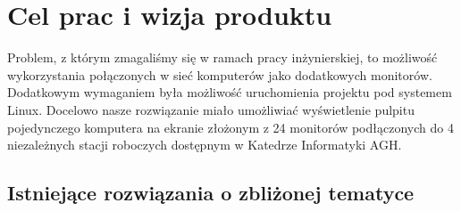 \section{Cel prac i wizja produktu}

  Problem, z którym zmagaliśmy się w ramach pracy inżynierskiej, to możliwość wykorzystania połączonych w sieć komputerów jako dodatkowych monitorów. Dodatkowym wymaganiem była możliwość uruchomienia projektu pod systemem Linux. Docelowo nasze rozwiązanie miało umożliwiać wyświetlenie pulpitu pojedynczego komputera na ekranie złożonym z 24 monitorów podłączonych do 4 niezależnych stacji roboczych dostępnym w Katedrze Informatyki AGH.

  \subsection{Istniejące rozwiązania o zbliżonej tematyce}


